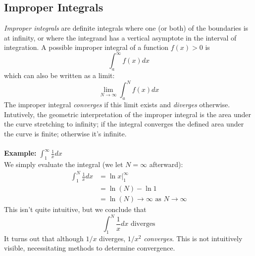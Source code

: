 \documentclass{report}
\begin{document}
\subsection{Improper Integrals} %
\textit{Improper integrals} are definite integrals where one (or both) of the boundaries is 
at infinity, or where the integrand has a vertical asymptote in the interval of integration.
A possible improper integral of a function $f(x)>0$ is
\begin{equation*}
\int_a^\infty f(x)dx
\end{equation*}
which can also be written as a limit:
\begin{equation*}
\lim_{N\to\infty}\int_a^Nf(x)dx
\end{equation*}
The improper integral \textit{converges} if this limit exists and \textit{diverges} otherwise. 
Intutively, the geometric interpretation of the improper integral is the area under the curve
stretching to infinity; if the integral converges the defined area under the curve is finite;
otherwise it's infinite.\\
\vspace{1mm}\\
\textbf{Example: }$\int_1^\infty\frac{1}{x}dx$\\
We simply evaluate the integral (we let $N=\infty$ afterward):
\begin{align*}
\int_1^N\frac{1}{x}dx&=\ln x|^\infty_1\\
&=\ln(N)-\ln1\\
&=\ln(N)\to\infty\text{ as }N\to\infty
\end{align*}
This isn't quite intuitive, but we conclude that 
\begin{equation*}
\int_1^N\frac{1}{x}dx\text{ diverges}
\end{equation*}
It turns out that although $1/x$ diverges, $1/x^2$ \textit{converges}. This is not intuitively 
visible, necessitating methods to determine convergence.
\newpage
\end{document}
